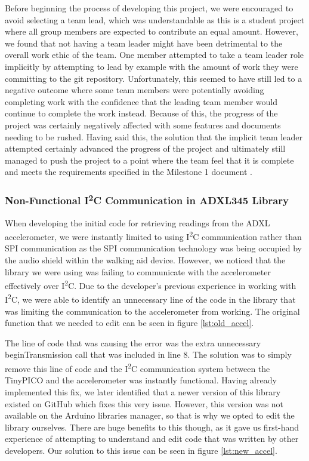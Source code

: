                 Before beginning the process of developing this project, we were encouraged to avoid selecting a team lead, which was understandable as this is a student project where all group members are expected to contribute an equal amount. However, we found that not having a team leader might have been detrimental to the overall work ethic of the team. One member attempted to take a team leader role implicitly by attempting to lead by example with the amount of work they were committing to the git repository. Unfortunately, this seemed to have still led to a negative outcome where some team members were potentially avoiding completing work with the confidence that the leading team member would continue to complete the work instead. Because of this, the progress of the project was certainly negatively affected with some features and documents needing to be rushed. Having said this, the solution that the implicit team leader attempted certainly advanced the progress of the project and ultimately still managed to push the project to a point where the team feel that it is complete and meets the requirements specified in the Milestone 1 document \cite{coaker}.

            \subsubsection{Non-Functional I\textsuperscript{2}C Communication in ADXL345 Library}

                When developing the initial code for retrieving readings from the ADXL accelerometer, we were instantly limited to using I\textsuperscript{2}C communication rather than SPI communication as the SPI communication technology was being occupied by the audio shield within the walking aid device. However, we noticed that the library we were using was failing to communicate with the accelerometer effectively over I\textsuperscript{2}C. Due to the developer's previous experience in working with I\textsuperscript{2}C, we were able to identify an unnecessary line of the code in the library that was limiting the communication to the accelerometer from working. The original function that we needed to edit can be seen in figure \ref{lst:old_accel}.

                

                The line of code that was causing the error was the extra unnecessary beginTransmission call that was included in line 8. The solution was to simply remove this line of code and the I\textsuperscript{2}C communication system between the TinyPICO and the accelerometer was instantly functional. Having already implemented this fix, we later identified that a newer version of this library existed on GitHub which fixes this very issue. However, this version was not available on the Arduino libraries manager, so that is why we opted to edit the library ourselves. There are huge benefits to this though, as it gave us first-hand experience of attempting to understand and edit code that was written by other developers. Our solution to this issue can be seen in figure \ref{lst:new_accel}.

